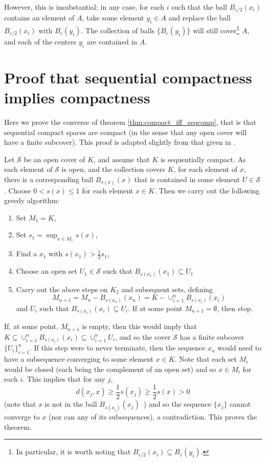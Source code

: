 \begin{appendices}
However, this is insubstantial: in any case, for each $i$ such that the ball $B_{\varepsilon/2}(x_{i})$ contains an element of $A$, take some element $y_{i}\in A$ and replace the ball $B_{\varepsilon/2}(x_{i})$ with $B_{\varepsilon}(y_{i})$. The collection of balls $\{ B_{\varepsilon}(y_{i}) \}$ will still cover\footnote{In particular, it is worth noting that \mbox{$B_{\varepsilon/2}(x_{i}) \subseteq B_{\varepsilon}(y_{i})$.}} $A$, and each of the centers $y_{i}$ are contained in $A$.

\section{Proof that sequential compactness implies compactness}

Here we prove the converse of theorem \ref{thm:compact_iff_seqcomp}, that is that sequential compact spaces are compact (in the sense that any open cover will have a finite subcover). This proof is adapted slightly from that given in \cite{preiss}.

Let $\mathcal{S}$ be an open cover of $K$, and assume that $K$ is sequentially compact. As each element of $\mathcal{S}$ is open, and the collection covers $K$, for each element of $x$, there is a corresponding ball $B_{s(x)}(x)$ that is contained in some element $U \in \mathcal{S}$. Choose $0 < s(x)\leq 1$ for each element $x\in K$. Then we carry out the following greedy algorithm:
\begin{enumerate}
    \item Set $M_{1} = K$,
    \item Set $s_{1} = \sup_{x\in M_{1}} s(x)$,
    \item Find a $x_{1}$ with $s(x_{1}) > \frac{1}{2} s_{1}$,
    \item Choose an open set $U_{1}\in \mathcal{S}$ such that $B_{s(x_{1})}(x_{1}) \subseteq U_{1}$
    \item Carry out the above steps on $K_2$ and subsequent sets, defining \[M_{n+1} = M_{n} - B_{s(x_{n})}(x_{n}) = K - \cup_{i=1}^{n} B_{s(x_{i})}(x_{i}) \] and $U_{i}$ such that $B_{s(x_{i})}(x_{i}) \subseteq U_{i}$. If at some point $M_{n+1} = \emptyset$, then stop.
\end{enumerate}
If, at some point, $M_{n+1}$ is empty, then this would imply that $K \subseteq \cup_{i=1}^{n} B_{s(x_{i})}(x_{i}) \subseteq \cup_{i=1}^{n} U_{i}$, and so the cover $\mathcal{S}$ has a finite subcover $\{U_{i}\}_{i=1}^{n}$.
If this step were to never terminate, then the sequence $x_{n}$ would need to have a subsequence converging to some element $x \in K$. Note that each set $M_{i}$ would be closed (each being the complement of an open set) and so $x\in M_{i}$ for each $i$. This implies that for any $j$, \[ d(x_{j},x) \geq \frac{1}{2} s(x_{j}) \geq \frac{1}{2} s(x) > 0 \] (note that $x$ is not in the ball $B_{s(x_{j})}(x_{j})$\ ) and so the sequence $\{x_{j}\}$ cannot converge to $x$ (nor can any of its subsequences), a contradiction. This proves the theorem.



\end{appendices}